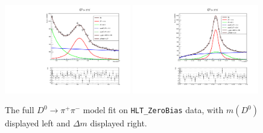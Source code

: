 \begin{figure}[htp]
    \begin{center}
      \includegraphics[width=0.49\textwidth]{figures/chapter4/normalization_fit/m_pipiDimuon_afterMvaCut.pdf}
      \includegraphics[width=0.49\textwidth]{figures/chapter4/normalization_fit/dm_pipiDimuon_afterMvaCut.pdf}\\
    \end{center}
    \caption{
        The full $D^0 \to \pi^+ \pi^-$ model fit on \texttt{HLT\_ZeroBias} data, with $m(D^0)$ displayed left and $\Delta m$ displayed right.
    }
    \label{fig:d0pipi_uml_fit}
\end{figure}

